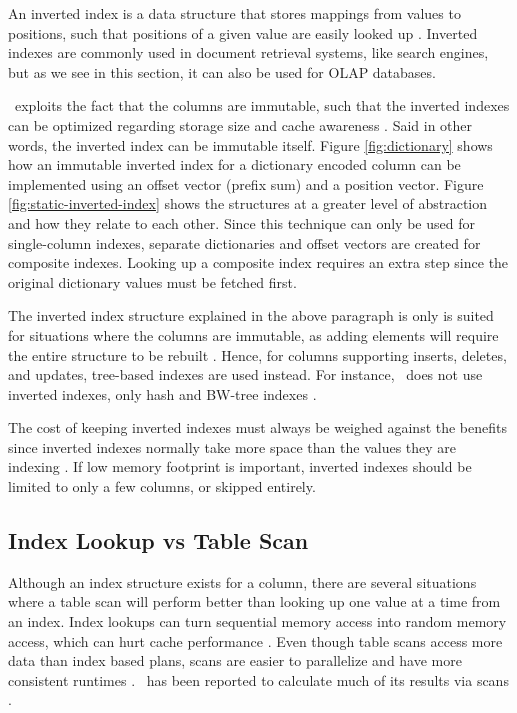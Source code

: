 An inverted index is a data structure that stores mappings from values to positions, such that positions of a given value are easily looked up \cite{Wikipedia_contributors2015-gt}. Inverted indexes are commonly used in document retrieval systems, like search engines, but as we see in this section, it can also be used for OLAP databases.

\hyrise~exploits the fact that the columns are immutable, such that the inverted indexes can be optimized regarding storage size and cache awareness \cite{Schwalb2014-hn}. Said in other words, the inverted index can be immutable itself. Figure \ref{fig:dictionary} shows how an immutable inverted index for a dictionary encoded column can be implemented using an offset vector (prefix sum) and a position vector. Figure \ref{fig:static-inverted-index} shows the structures at a greater level of abstraction and how they relate to each other. Since this technique can only be used for single-column indexes, separate dictionaries and offset vectors are created for composite indexes. Looking up a composite index requires an extra step since the original dictionary values must be fetched first.

The inverted index structure explained in the above paragraph is only is suited for situations where the columns are immutable, as adding elements will require the entire structure to be rebuilt \cite{Schwalb2014-hn}. Hence, for columns supporting inserts, deletes, and updates, tree-based indexes are used instead. For instance, \mssql~does not use inverted indexes, only hash and BW-tree indexes \cite{noauthor_undated-vq, Delaney2014-ip}.

The cost of keeping inverted indexes must always be weighed against the benefits \cite{Lemke2010-is} since inverted indexes normally take more space than the values they are indexing \cite{Moffat1992-tz}. If low memory footprint is important, inverted indexes should be limited to only a few columns, or skipped entirely.

\subsection{Index Lookup vs Table Scan}
\label{sub:Index Lookup vs Table Scan}
Although an index structure exists for a column, there are several situations where a table scan will perform better than looking up one value at a time from an index. Index lookups can turn sequential memory access into random memory access, which can hurt cache performance \cite{Boncz2002-yj}. Even though table scans access more data than index based plans, scans are easier to parallelize and have more consistent runtimes \cite{Raman2008-gi}. \qlikview~has been reported to calculate much of its results via scans \cite{noauthor_undated-js}.

